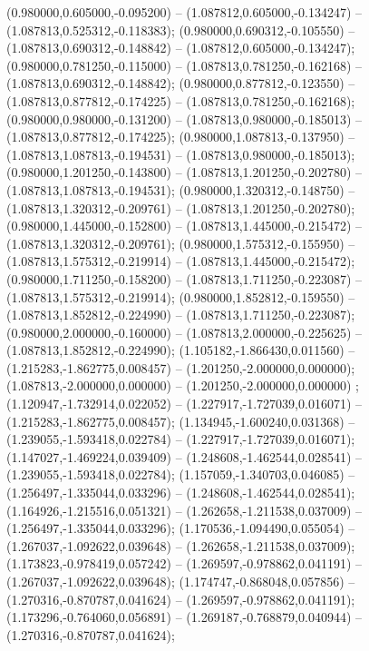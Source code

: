  (0.980000,0.605000,-0.095200) -- (1.087812,0.605000,-0.134247) -- (1.087813,0.525312,-0.118383);
 (0.980000,0.690312,-0.105550) -- (1.087813,0.690312,-0.148842) -- (1.087812,0.605000,-0.134247);
 (0.980000,0.781250,-0.115000) -- (1.087813,0.781250,-0.162168) -- (1.087813,0.690312,-0.148842);
 (0.980000,0.877812,-0.123550) -- (1.087813,0.877812,-0.174225) -- (1.087813,0.781250,-0.162168);
 (0.980000,0.980000,-0.131200) -- (1.087813,0.980000,-0.185013) -- (1.087813,0.877812,-0.174225);
 (0.980000,1.087813,-0.137950) -- (1.087813,1.087813,-0.194531) -- (1.087813,0.980000,-0.185013);
 (0.980000,1.201250,-0.143800) -- (1.087813,1.201250,-0.202780) -- (1.087813,1.087813,-0.194531);
 (0.980000,1.320312,-0.148750) -- (1.087813,1.320312,-0.209761) -- (1.087813,1.201250,-0.202780);
 (0.980000,1.445000,-0.152800) -- (1.087813,1.445000,-0.215472) -- (1.087813,1.320312,-0.209761);
 (0.980000,1.575312,-0.155950) -- (1.087813,1.575312,-0.219914) -- (1.087813,1.445000,-0.215472);
 (0.980000,1.711250,-0.158200) -- (1.087813,1.711250,-0.223087) -- (1.087813,1.575312,-0.219914);
 (0.980000,1.852812,-0.159550) -- (1.087813,1.852812,-0.224990) -- (1.087813,1.711250,-0.223087);
 (0.980000,2.000000,-0.160000) -- (1.087813,2.000000,-0.225625) -- (1.087813,1.852812,-0.224990);
 (1.105182,-1.866430,0.011560) -- (1.215283,-1.862775,0.008457) -- (1.201250,-2.000000,0.000000);
 (1.087813,-2.000000,0.000000) -- (1.201250,-2.000000,0.000000) ;
 (1.120947,-1.732914,0.022052) -- (1.227917,-1.727039,0.016071) -- (1.215283,-1.862775,0.008457);
 (1.134945,-1.600240,0.031368) -- (1.239055,-1.593418,0.022784) -- (1.227917,-1.727039,0.016071);
 (1.147027,-1.469224,0.039409) -- (1.248608,-1.462544,0.028541) -- (1.239055,-1.593418,0.022784);
 (1.157059,-1.340703,0.046085) -- (1.256497,-1.335044,0.033296) -- (1.248608,-1.462544,0.028541);
 (1.164926,-1.215516,0.051321) -- (1.262658,-1.211538,0.037009) -- (1.256497,-1.335044,0.033296);
 (1.170536,-1.094490,0.055054) -- (1.267037,-1.092622,0.039648) -- (1.262658,-1.211538,0.037009);
 (1.173823,-0.978419,0.057242) -- (1.269597,-0.978862,0.041191) -- (1.267037,-1.092622,0.039648);
 (1.174747,-0.868048,0.057856) -- (1.270316,-0.870787,0.041624) -- (1.269597,-0.978862,0.041191);
 (1.173296,-0.764060,0.056891) -- (1.269187,-0.768879,0.040944) -- (1.270316,-0.870787,0.041624);
